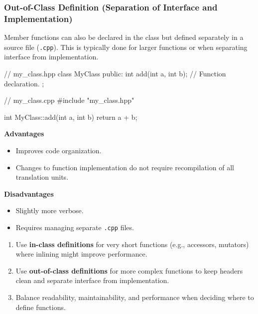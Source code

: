 \subsubsection{Out-of-Class Definition (Separation of Interface and Implementation)}

Member functions can also be declared in the class but defined separately in a source file (\texttt{.cpp}). This is typically done for larger functions or when separating interface from implementation.

\begin{codeblock}[language=C++, numbers=none]
// my_class.hpp
class MyClass {
public:
    int add(int a, int b); // Function declaration.
};
\end{codeblock}

\begin{codeblock}[language=C++, numbers=none]
// my_class.cpp
#include "my_class.hpp"

int MyClass::add(int a, int b) {
    return a + b;
}
\end{codeblock}

\begin{minipage}{0.48\textwidth}
    \textbf{Advantages}
    \begin{itemize}
        \item Improves code organization.
        \item Changes to function implementation do not require recompilation of all translation units.
    \end{itemize}
\end{minipage}%
\hfill
\begin{minipage}{0.48\textwidth}
    \textbf{Disadvantages}
    \begin{itemize}
        \item Slightly more verbose.
        \item Requires managing separate \texttt{.cpp} files.
    \end{itemize}
\end{minipage}

\begin{tipsblock}
    \begin{enumerate}
        \item Use \textbf{in-class definitions} for very short functions (e.g., accessors, mutators) where inlining might improve performance.
        \item Use \textbf{out-of-class definitions} for more complex functions to keep headers clean and separate interface from implementation.
        \item Balance readability, maintainability, and performance when deciding where to define functions.
    \end{enumerate}
\end{tipsblock}

